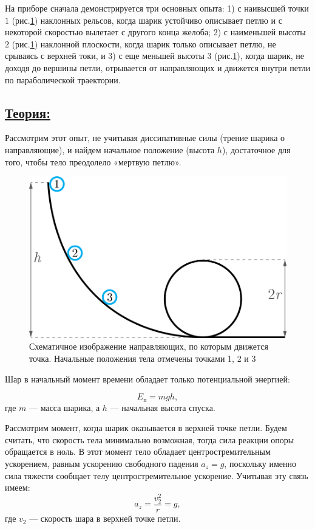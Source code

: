 \documentclass[14pt,a4paper,oneside]{extarticle}	%
\begin{document}
На приборе сначала демонстрируется три основных опыта: 1) с наивысшей точки $ 1 $ (рис.\ref{loop-2}) наклонных рельсов, когда шарик устойчиво описывает петлю и с некоторой скоростью вылетает с другого конца желоба; 2) с наименьшей высоты $ 2 $ (рис.\ref{loop-2}) наклонной плоскости, когда шарик только описывает петлю, не срываясь с верхней токи, и 3) с еще меньшей высоты $ 3 $ (рис.\ref{loop-2}), когда шарик, не доходя до вершины петли, отрывается от направляющих и движется внутри петли по параболической траектории.

\newpage
\subsection*{\underline{Теория:}}

Рассмотрим этот опыт, не учитывая диссипативные силы (трение шарика о направляющие), и найдем начальное положение (высота $ h $), достаточное для того, чтобы тело преодолело «мертвую петлю».  

\begin{figure}[H] 
	\centering 	
	\includegraphics[width=0.5\linewidth]{loop-2.png}
	\caption{Схематичное изображение направляющих, по которым движется точка. Начальные положения тела отмечены точками 1, 2 и 3}
	\label{loop-2}
\end{figure}

Шар в начальный момент времени обладает только потенциальной энергией:
  
\begin{equation}\label{loop-eq1}
E_{\text{п}} = mgh,
\end{equation}
 где $ m $ — масса шарика, а $ h $ — начальная высота спуска.
 
Рассмотрим момент, когда шарик оказывается в верхней точке петли. Будем считать, что скорость тела минимально возможная, тогда сила реакции опоры обращается в ноль.
В этот момент тело обладает центростремительным ускорением, равным ускорению свободного падения $ a_{z} = g $, поскольку именно сила тяжести сообщает телу центростремительное ускорение.
Учитывая эту связь имеем:  
\begin{equation}\label{loop-eq5}
a_{z} = \frac{v^{2}_{2}}{r} = g,
\end{equation}
где $ v_2 $ — скорость шара в верхней точке петли.
\end{document}
